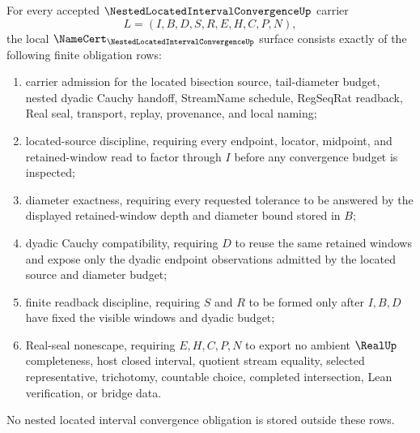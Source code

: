 \begin{theorem}
\label{thm:nested-located-interval-convergence-namecert-obligations}
For every accepted $\NestedLocatedIntervalConvergenceUp$ carrier
$$
L=(I,B,D,S,R,E,H,C,P,N),
$$
the local $\NameCert_{\NestedLocatedIntervalConvergenceUp}$ surface consists exactly of the following finite obligation rows:
\begin{enumerate}
\item carrier admission for the located bisection source, tail-diameter budget, nested dyadic Cauchy handoff, StreamName schedule, RegSeqRat readback, Real seal, transport, replay, provenance, and local naming;
\item located-source discipline, requiring every endpoint, locator, midpoint, and retained-window read to factor through $I$ before any convergence budget is inspected;
\item diameter exactness, requiring every requested tolerance to be answered by the displayed retained-window depth and diameter bound stored in $B$;
\item dyadic Cauchy compatibility, requiring $D$ to reuse the same retained windows and expose only the dyadic endpoint observations admitted by the located source and diameter budget;
\item finite readback discipline, requiring $S$ and $R$ to be formed only after $I,B,D$ have fixed the visible windows and dyadic budget;
\item Real-seal nonescape, requiring $E,H,C,P,N$ to export no ambient $\RealUp$ completeness, host closed interval, quotient stream equality, selected representative, trichotomy, countable choice, completed intersection, Lean verification, or bridge data.
\end{enumerate}
No nested located interval convergence obligation is stored outside these rows.
\end{theorem}
